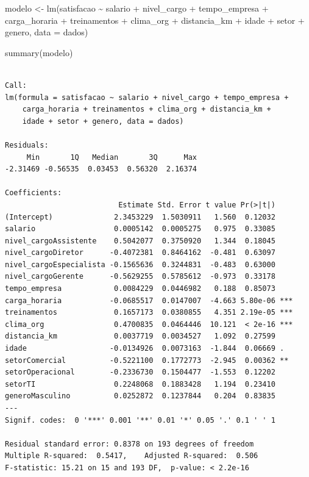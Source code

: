 \documentclass[
  letterpaper,
  DIV=11,
  numbers=noendperiod]{scrartcl}
\newenvironment{Shaded}{\begin{snugshade}}{\end{snugshade}}
\newcommand{\AttributeTok}[1]{\textcolor[rgb]{0.40,0.45,0.13}{#1}}
\newcommand{\FunctionTok}[1]{\textcolor[rgb]{0.28,0.35,0.67}{#1}}
\newcommand{\NormalTok}[1]{\textcolor[rgb]{0.00,0.23,0.31}{#1}}
\newcommand{\OtherTok}[1]{\textcolor[rgb]{0.00,0.23,0.31}{#1}}
\newcommand{\SpecialCharTok}[1]{\textcolor[rgb]{0.37,0.37,0.37}{#1}}
\begin{document}
\begin{Shaded}
\begin{Highlighting}[]
\NormalTok{modelo }\OtherTok{\textless{}{-}} \FunctionTok{lm}\NormalTok{(satisfacao }\SpecialCharTok{\textasciitilde{}}\NormalTok{ salario }\SpecialCharTok{+}\NormalTok{ nivel\_cargo }\SpecialCharTok{+}\NormalTok{ tempo\_empresa }\SpecialCharTok{+}\NormalTok{ carga\_horaria }\SpecialCharTok{+}\NormalTok{ treinamentos }\SpecialCharTok{+}\NormalTok{ clima\_org }\SpecialCharTok{+}\NormalTok{ distancia\_km }\SpecialCharTok{+}\NormalTok{ idade }\SpecialCharTok{+}\NormalTok{ setor }\SpecialCharTok{+}\NormalTok{ genero, }\AttributeTok{data =}\NormalTok{ dados)}

\FunctionTok{summary}\NormalTok{(modelo)}
\end{Highlighting}
\end{Shaded}

\begin{verbatim}

Call:
lm(formula = satisfacao ~ salario + nivel_cargo + tempo_empresa + 
    carga_horaria + treinamentos + clima_org + distancia_km + 
    idade + setor + genero, data = dados)

Residuals:
     Min       1Q   Median       3Q      Max 
-2.31469 -0.56535  0.03453  0.56320  2.16374 

Coefficients:
                          Estimate Std. Error t value Pr(>|t|)    
(Intercept)              2.3453229  1.5030911   1.560  0.12032    
salario                  0.0005142  0.0005275   0.975  0.33085    
nivel_cargoAssistente    0.5042077  0.3750920   1.344  0.18045    
nivel_cargoDiretor      -0.4072381  0.8464162  -0.481  0.63097    
nivel_cargoEspecialista -0.1565636  0.3244831  -0.483  0.63000    
nivel_cargoGerente      -0.5629255  0.5785612  -0.973  0.33178    
tempo_empresa            0.0084229  0.0446982   0.188  0.85073    
carga_horaria           -0.0685517  0.0147007  -4.663 5.80e-06 ***
treinamentos             0.1657173  0.0380855   4.351 2.19e-05 ***
clima_org                0.4700835  0.0464446  10.121  < 2e-16 ***
distancia_km             0.0037719  0.0034527   1.092  0.27599    
idade                   -0.0134926  0.0073163  -1.844  0.06669 .  
setorComercial          -0.5221100  0.1772773  -2.945  0.00362 ** 
setorOperacional        -0.2336730  0.1504477  -1.553  0.12202    
setorTI                  0.2248068  0.1883428   1.194  0.23410    
generoMasculino          0.0252872  0.1237844   0.204  0.83835    
---
Signif. codes:  0 '***' 0.001 '**' 0.01 '*' 0.05 '.' 0.1 ' ' 1

Residual standard error: 0.8378 on 193 degrees of freedom
Multiple R-squared:  0.5417,    Adjusted R-squared:  0.506 
F-statistic: 15.21 on 15 and 193 DF,  p-value: < 2.2e-16
\end{verbatim}
\end{document}

